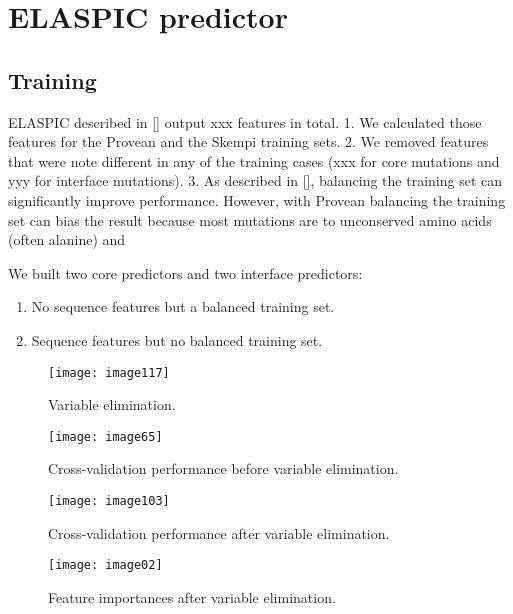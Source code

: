 
\section{ELASPIC predictor}

\subsection{Training}

ELASPIC described in [] output xxx features in total. 
1. We calculated those features for the Provean and the Skempi training sets. 
2. We removed features that were note different in any of the training cases (xxx for core mutations and yyy for interface mutations).
3. As described in [], balancing the training set can significantly improve performance. However, with Provean balancing the training set can bias the result because most mutations are to unconserved amino acids (often alanine) and 



We built two core predictors and two interface predictors:

\begin{enumerate}
	\item No sequence features but a balanced training set.
	\item Sequence features but no balanced training set.
\end{enumerate}


\begin{figure}[H]
	\centering
	\texttt{[image: image117]}
	\caption{Variable elimination.}
\end{figure}

\begin{figure}[H]
	\centering
	\texttt{[image: image65]}
	\caption{Cross-validation performance before variable elimination.}
\end{figure}

\begin{figure}[H]
	\centering
	\texttt{[image: image103]}
	\caption{Cross-validation performance after variable elimination.}
\end{figure}

\begin{figure}[H]
	\centering
	\texttt{[image: image02]}
	\caption{Feature importances after variable elimination.}
\end{figure}




